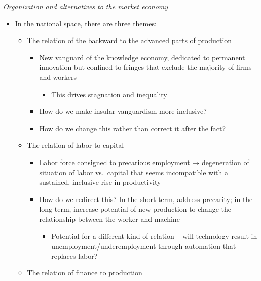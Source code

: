 \emph{Organization and alternatives to the market economy}

\begin{itemize}
\tightlist
\item
  In the national space, there are three themes:

  \begin{itemize}
  \tightlist
  \item
    The relation of the backward to the advanced parts of production

    \begin{itemize}
    \tightlist
    \item
      New vanguard of the knowledge economy, dedicated to permanent
      innovation but confined to fringes that exclude the majority of
      firms and workers

      \begin{itemize}
      \tightlist
      \item
        This drives stagnation and inequality
      \end{itemize}
    \item
      How do we make insular vanguardism more inclusive?
    \item
      How do we change this rather than correct it after the fact?
    \end{itemize}
  \item
    The relation of labor to capital

    \begin{itemize}
    \tightlist
    \item
      Labor force consigned to precarious employment → degeneration of
      situation of labor vs.~capital that seems incompatible with a
      sustained, inclusive rise in productivity
    \item
      How do we redirect this? In the short term, address precarity; in
      the long-term, increase potential of new production to change the
      relationship between the worker and machine

      \begin{itemize}
      \tightlist
      \item
        Potential for a different kind of relation -- will technology
        result in unemployment/underemployment through automation that
        replaces labor?
      \end{itemize}
    \end{itemize}
  \item
    The relation of finance to production


\end{itemize}
\end{itemize}
